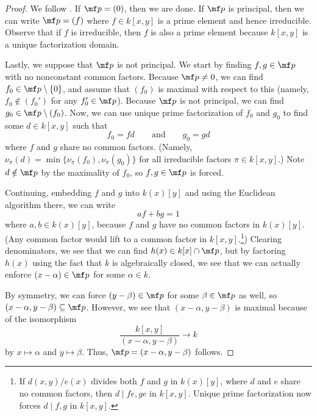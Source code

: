 \documentclass[../notes.tex]{subfiles}
\begin{document}
\begin{proof}
	We follow \cite[Exercise~3.2.E]{rising-sea}. If $\mf p=(0)$, then we are done. If $\mf p$ is principal, then we can write $\mf p=(f)$ where $f\in k[x,y]$ is a prime element and hence irreducible. Observe that if $f$ is irreducible, then $f$ is also a prime element because $k[x,y]$ is a unique factorization domain.

	Lastly, we suppose that $\mf p$ is not principal. We start by finding $f,g\in\mf p$ with no nonconstant common factors. Because $\mf p\ne0$, we can find $f_0\in\mf p\setminus\{0\}$, and assume that $(f_0)$ is maximal with respect to this (namely, $f_0\notin(f_0')$ for any $f_0'\in\mf p$). Because $\mf p$ is not principal, we can find $g_0\in\mf p\setminus(f_0)$. Now, we can use unique prime factorization of $f_0$ and $g_0$ to find some $d\in k[x,y]$ such that
	\[f_0=fd\qquad\text{and}\qquad g_0=gd\]
	where $f$ and $g$ share no common factors. (Namely, $\nu_\pi(d)=\min\{\nu_\pi(f_0),\nu_\pi(g_0)\}$ for all irreducible factors $\pi\in k[x,y]$.) Note $d\notin\mf p$ by the maximality of $f_0$, so $f,g\in\mf p$ is forced.

	Continuing, embedding $f$ and $g$ into $k(x)[y]$ and using the Euclidean algorithm there, we can write
	\[af+bg=1\]
	where $a,b\in k(x)[y]$, because $f$ and $g$ have no common factors in $k(x)[y]$. (Any common factor would lift to a common factor in $k[x,y]$.\footnote{If $d(x,y)/e(x)$ divides both $f$ and $g$ in $k(x)[y]$, where $d$ and $e$ share no common factors, then $d\mid fe,ge$ in $k[x,y]$. Unique prime factorization now forces $d\mid f,g$ in $k[x,y]$.}) Clearing denominators, we see that we can find $h(x)\in k[x]\cap\mf p$, but by factoring $h(x)$ using the fact that $k$ is algebraically closed, we see that we can actually enforce $(x-\alpha)\in\mf p$ for some $\alpha\in k$.

	By symmetry, we can force $(y-\beta)\in\mf p$ for some $\beta\in\mf p$ as well, so $(x-\alpha,y-\beta)\subseteq\mf p$. However, we see that $(x-\alpha,y-\beta)$ is maximal because of the isomorphism
	\[\frac{k[x,y]}{(x-\alpha,y-\beta)}\to k\]
	by $x\mapsto\alpha$ and $y\mapsto\beta$. Thus, $\mf p=(x-\alpha,y-\beta)$ follows.
\end{proof}
\end{document}

